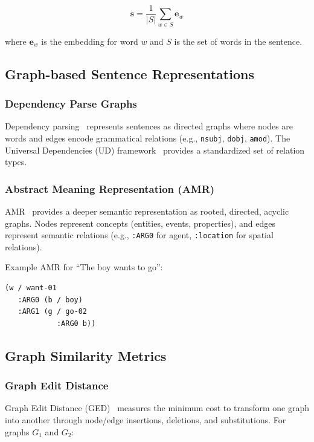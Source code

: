 \documentclass[11pt,a4paper]{article}
\begin{document}
\begin{equation}
\mathbf{s} = \frac{1}{|S|} \sum_{w \in S} \mathbf{e}_w
\end{equation}

where $\mathbf{e}_w$ is the embedding for word $w$ and $S$ is the set of words in the sentence.

\subsection{Graph-based Sentence Representations}

\subsubsection{Dependency Parse Graphs}

Dependency parsing~\citep{kubler2009dependency} represents sentences as directed graphs where nodes are words and edges encode grammatical relations (e.g., \texttt{nsubj}, \texttt{dobj}, \texttt{amod}). The Universal Dependencies (UD) framework~\citep{de2016universal} provides a standardized set of relation types.

\subsubsection{Abstract Meaning Representation (AMR)}

AMR~\citep{banarescu2013abstract} provides a deeper semantic representation as rooted, directed, acyclic graphs. Nodes represent concepts (entities, events, properties), and edges represent semantic relations (e.g., \texttt{:ARG0} for agent, \texttt{:location} for spatial relations).

Example AMR for ``The boy wants to go'':
\begin{verbatim}
(w / want-01
   :ARG0 (b / boy)
   :ARG1 (g / go-02
            :ARG0 b))
\end{verbatim}

\subsection{Graph Similarity Metrics}

\subsubsection{Graph Edit Distance}

Graph Edit Distance (GED)~\citep{bunke1997relation} measures the minimum cost to transform one graph into another through node/edge insertions, deletions, and substitutions. For graphs $G_1$ and $G_2$:
\end{document}
